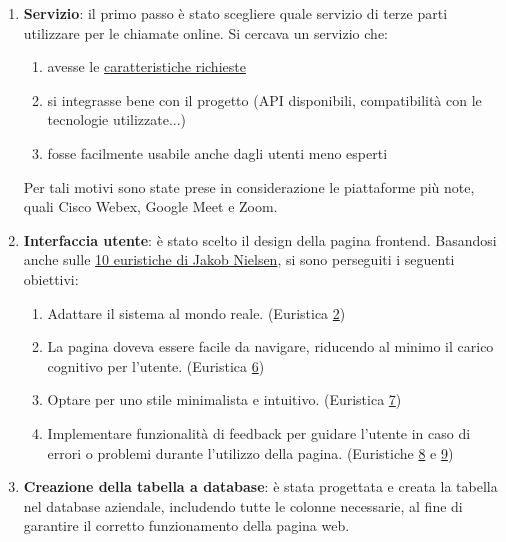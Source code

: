 \begin{enumerate}

   \item \textbf{Servizio}: il primo passo è stato scegliere quale servizio di terze parti utilizzare per le chiamate online. 
   Si cercava un servizio che: 
   
      \begin{enumerate}
         \item avesse le \hyperref[sec:caratteristiche_meeting]{caratteristiche richieste}
         \item si integrasse bene con il progetto (API disponibili, compatibilità con le tecnologie utilizzate...)
         \item fosse facilmente usabile anche dagli utenti meno esperti
      \end{enumerate}
   
   Per tali motivi sono state prese in considerazione le piattaforme più note, quali Cisco Webex, Google Meet e Zoom.
   
   \item \textbf{Interfaccia utente}: è stato scelto il design della pagina frontend. 
   Basandosi anche sulle \hyperref[sec:euristiche_nielsen]{10 euristiche di Jakob Nielsen}, si sono perseguiti i seguenti obiettivi:

   \begin{enumerate}
      \item Adattare il sistema al mondo reale. (Euristica \hyperref[sec:euristiche_nielsen2]{2})
      \item La pagina doveva essere facile da navigare, riducendo al minimo il carico cognitivo per l'utente. 
      (Euristica \hyperref[sec:euristiche_nielsen6]{6})
      \item  Optare per uno stile minimalista e intuitivo. (Euristica \hyperref[sec:euristiche_nielsen7]{7})
      \item Implementare funzionalità di feedback per guidare l'utente in caso di errori o problemi durante l'utilizzo della pagina.
      (Euristiche \hyperref[sec:euristiche_nielsen8]{8} e \hyperref[sec:euristiche_nielsen9]{9})
   \end{enumerate}

   \item \textbf{Creazione della tabella a database}: è stata progettata e creata la tabella nel database aziendale,
   includendo tutte le colonne necessarie,  al fine di garantire il corretto funzionamento della pagina web.


\end{enumerate}
